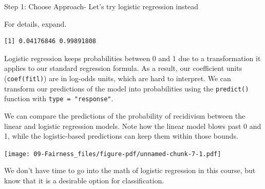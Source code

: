 \documentclass[
  letterpaper,
  DIV=11,
  numbers=noendperiod]{scrreprt}
\newenvironment{Shaded}{\begin{snugshade}}{\end{snugshade}}
\newcommand{\AttributeTok}[1]{\textcolor[rgb]{0.40,0.45,0.13}{#1}}
\newcommand{\CommentTok}[1]{\textcolor[rgb]{0.37,0.37,0.37}{#1}}
\newcommand{\DocumentationTok}[1]{\textcolor[rgb]{0.37,0.37,0.37}{\textit{#1}}}
\newcommand{\FunctionTok}[1]{\textcolor[rgb]{0.28,0.35,0.67}{#1}}
\newcommand{\NormalTok}[1]{\textcolor[rgb]{0.00,0.23,0.31}{#1}}
\newcommand{\OtherTok}[1]{\textcolor[rgb]{0.00,0.23,0.31}{#1}}
\newcommand{\SpecialCharTok}[1]{\textcolor[rgb]{0.37,0.37,0.37}{#1}}
\newcommand{\StringTok}[1]{\textcolor[rgb]{0.13,0.47,0.30}{#1}}
\begin{document}
Step 1: Choose Approach- Let's try logistic regression instead

For details, expand.

\begin{Shaded}
\end{Shaded}

\begin{verbatim}
[1] 0.04176846 0.99891808
\end{verbatim}

Logistic regression keeps probabilities between 0 and 1 due to a
transformation it applies to our standard regression formula. As a
result, our coefficient units (\texttt{coef(fitl)}) are in log-odds
units, which are hard to interpret. We can transform our predictions of
the model into probabilities using the \texttt{predict()} function with
\texttt{type\ =\ "response"}.

We can compare the predictions of the probability of recidivism between
the linear and logistic regression models. Note how the linear model
blows past 0 and 1, while the logistic-based predictions can keep them
within those bounds.

\texttt{[image: 09-Fairness\_files/figure-pdf/unnamed-chunk-7-1.pdf]}

We don't have time to go into the math of logistic regression in this
course, but know that it is a desirable option for classification.
\end{document}
